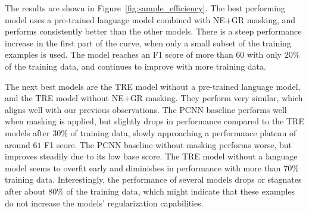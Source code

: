 \documentclass[akbc,twoside,11pt]{article}
\begin{document}
The results are shown in Figure~\ref{fig:sample_efficiency}. The best performing model uses a pre-trained language model combined with NE$+$GR masking, and performs consistently better than the other models. There is a steep performance increase in the first part of the curve, when only a small subset of the training examples is used. The model reaches an F1 score of more than $60$ with only $20\%$ of the training data, and continues to improve with more training data. 

The next best models are the TRE model without a pre-trained language model, and the TRE model without NE$+$GR masking. They perform very similar, which aligns well with our previous observations. The PCNN baseline performs well when masking is applied, but slightly drops in performance compared to the TRE models after $30\%$ of training data, slowly approaching a performance plateau of around $61$ F1 score. The PCNN baseline without masking performs worse, but improves steadily due to its low base score. The TRE model without a language model seems to overfit early and diminishes in performance with more than $70\%$ training data. Interestingly, the performance of several models drops or stagnates after about 80\% of the training data, which might indicate that these examples do not increase the models' regularization capabilities.
\end{document}
